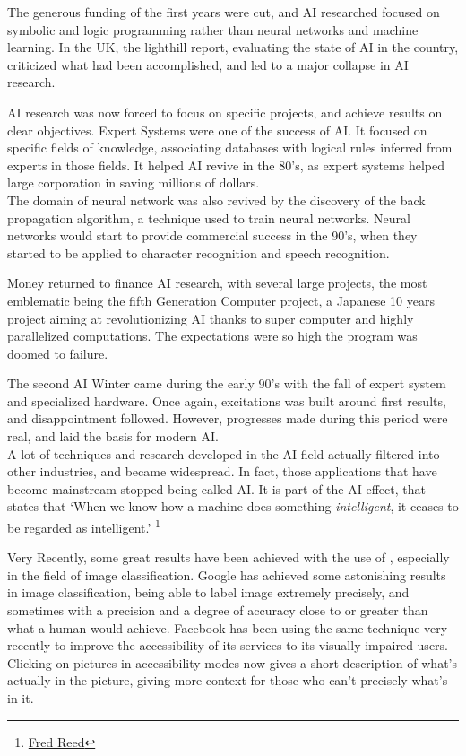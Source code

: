 \documentclass[12pt]{article}
\begin{document}
The generous funding of the first years were cut, and AI researched focused on
symbolic and logic programming rather than neural networks and machine learning.
In the UK, the lighthill report, evaluating the state of AI in the country,
criticized what had been accomplished, and led to a major collapse in AI
research.

AI research was now forced to focus on specific projects, and achieve results on
clear objectives. Expert Systems were one of the success of AI. It focused on
specific fields of knowledge, associating databases with logical rules
inferred from experts in those fields. It helped AI revive in the 80's, as expert
systems helped large corporation in saving millions of dollars.\\

The domain of neural network was also revived by the discovery of the back
propagation algorithm, a technique used to train neural networks. Neural
networks would start to provide commercial success in the 90's, when they
started to be  applied to character recognition and speech recognition.

Money returned to finance AI research, with several large projects, the most
emblematic being the fifth Generation Computer project, a Japanese 10 years
project aiming at revolutionizing AI thanks to super computer and highly
parallelized computations. The expectations were so high the program was doomed
to failure.

The second AI Winter came during the early 90's with the fall of expert system
and  specialized hardware. Once again, excitations was built around first
results, and  disappointment followed. However, progresses made during this
period were real,  and laid the basis for modern AI.\\

A lot of techniques and research developed in the AI field actually filtered
into  other industries, and became widespread. In fact, those applications that
have become  mainstream stopped being called AI. It is part of the AI effect,
that states that \lq When we know how a machine does something {\em
intelligent}, it ceases to be regarded as intelligent.\rq
\footnote{\href{http://www.washingtontimes.com/news/2006/apr/13/20060413-105217-7645r/}
{Fred Reed}}

Very Recently, some great results have been achieved with the use of
, especially  in the field of image classification. Google has
achieved some astonishing results in image classification, being able to
label image extremely precisely, and sometimes with a precision and a degree
of accuracy close to or greater than what a human would achieve.
Facebook has been using the same technique very recently to improve the
accessibility of its services to its visually impaired users. Clicking on
pictures in accessibility modes now gives a short description of what's actually
in the picture, giving more context for those who can't precisely what's in it.
\end{document}
